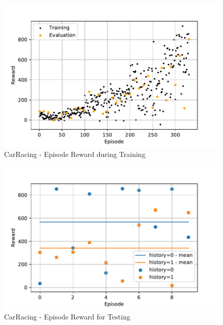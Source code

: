 \documentclass[
        a4paper,
        10pt,
        parskip = full,    %
    ]{scrartcl}
\begin{document}
\begin{figure}[H]
  \begin{center}
    \includegraphics{./images/CarRacing-v0/tb_train_eval_reward.pdf}
    \caption{CarRacing - Episode Reward during Training}
    \label{CarRacingTrainEvalReward}
  \end{center}
\end{figure}

\begin{figure}[H]
  \begin{center}
    \includegraphics{./images/CarRacing-v0/tb_test_reward.pdf}
    \caption{CarRacing - Episode Reward for Testing}
    \label{CarRacingTestReward}
  \end{center}
\end{figure}
\end{document}
